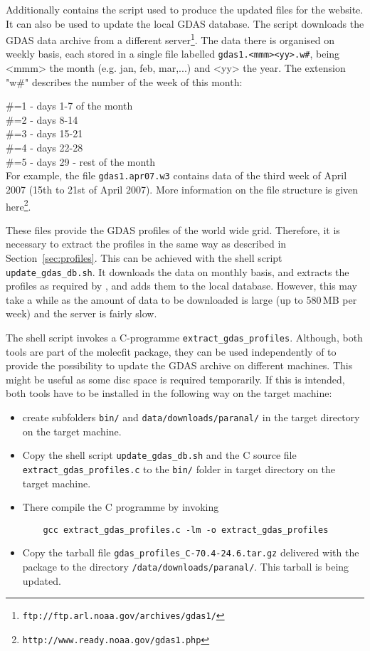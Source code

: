 Additionally \mf{} contains the script used to produce the updated files for
the website. It can also be used to update the local GDAS database. The script
downloads the GDAS data archive from a different
server\footnote{\tt ftp://ftp.arl.noaa.gov/archives/gdas1/}. The data there
is organised on weekly basis, each stored in a single file labelled
{\tt gdas1.<mmm><yy>.w\#}, being <mmm> the month (e.g. jan, feb, mar,...) and
<yy> the year. The extension "w\#" describes the number of the week of this
month:

\#=1 - days 1-7 of the month\\
\#=2 - days 8-14\\
\#=3 - days 15-21\\
\#=4 - days 22-28\\
\#=5 - days 29 - rest of the month \\

For example, the file {\tt gdas1.apr07.w3} contains data of the third
week of April 2007 (15th to 21st of April 2007). More information on the file
structure is given here\footnote{\tt http://www.ready.noaa.gov/gdas1.php}.

These files provide the GDAS profiles of the world wide grid. Therefore, it is
necessary to extract the profiles in the same way as described in
Section~\ref{sec:profiles}. This can be achieved with the shell script {\tt
update\_gdas\_db.sh}. It downloads the data on monthly basis, and extracts the
profiles as required by \mf{}, and adds them to the local database. However,
this may take a while as the amount of data to be downloaded is large (up to
580\,MB per week) and the server is fairly slow.

The shell script invokes a C-programme {\tt extract\_gdas\_profiles}. Although,
both tools are part of the molecfit package, they can be used independently of
\mf{} to provide the possibility to update the GDAS archive on different
machines. This might be useful as some disc space is required temporarily.  If
this is intended, both tools have to be installed in the following way on the
target machine:

\begin{itemize}
\item
  create subfolders {\tt bin/} and {\tt data/downloads/paranal/} in the target
  directory on the target machine.
\item
  Copy the shell script {\tt update\_gdas\_db.sh} and the C source file
  {\tt extract\_gdas\_profiles.c} to the {\tt bin/} folder in target directory
  on the target machine.
\item
  There compile the C programme by invoking
\begin{verbatim}
    gcc extract_gdas_profiles.c -lm -o extract_gdas_profiles
\end{verbatim}
\item
  Copy the tarball file {\tt gdas\_profiles\_C-70.4-24.6.tar.gz} delivered with
  the \mf{} package to the directory
  {\tt <targetdir@targetmachine>/data/downloads/paranal/}. This tarball is
  being updated.
\end{itemize}

